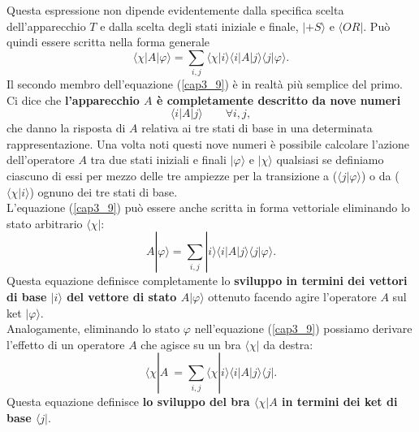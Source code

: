 \documentclass[a4paper,12pt,oneside]{book}
\begin{document}
Questa espressione non dipende evidentemente dalla specifica scelta dell'apparecchio $T$ e dalla scelta degli stati iniziale e finale, $| +S \rangle $ e $\langle OR |$. Può quindi essere scritta nella forma generale
	\begin{equation}
		\boxed{\boxed{
			\langle \chi | A | \varphi \rangle = \sum \limits_{i,j} \langle \chi | i \rangle \langle i | A | j \rangle \langle j | \varphi \rangle .
			}}
	\label{cap3_9}
	\end{equation}
Il secondo membro dell'equazione (\ref{cap3_9}) è in realtà più semplice del primo. Ci dice che \textbf{l'apparecchio $A$ è completamente descritto da nove numeri}
	\begin{equation}
		\boxed{
			\langle i | A | j \rangle  \qquad \forall i,j ,
			}
	\end{equation}
che danno la risposta di $A$ relativa ai tre stati di base in una determinata rappresentazione. Una volta noti questi nove numeri è possibile calcolare l'azione dell'operatore $A$ tra due stati iniziali e finali $| \varphi \rangle $ e $| \chi \rangle$ qualsiasi se definiamo ciascuno di essi per mezzo delle tre ampiezze per la transizione a ($\langle j | \varphi \rangle $) o da ($\langle \chi | i \rangle$) ognuno dei tre stati di base.\\

L'equazione (\ref{cap3_9}) può essere anche scritta in forma vettoriale eliminando lo stato arbitrario $\langle \chi | $:
	\begin{equation}
		\boxed{
			A| \varphi \rangle = \sum \limits_{i,j}  |i \rangle \langle i | A | j \rangle \langle j | \varphi \rangle .
			}
	\label{cap3_10}
	\end{equation}
Questa equazione definisce completamente lo \textbf{sviluppo in termini dei vettori di base $ | i \rangle$ del vettore di stato $A | \varphi \rangle $} ottenuto facendo agire l'operatore $A$ sul ket $ | \varphi \rangle$.\\

Analogamente, eliminando lo stato $\varphi$ nell'equazione (\ref{cap3_9}) possiamo derivare l'effetto di un operatore $A$ che agisce su un bra $ \langle \chi |$ da destra:
	\begin{equation}
		\boxed{
			\langle \chi | A\ = \sum \limits_{i,j} \langle \chi | i \rangle \langle i | A  | j \rangle \langle j | .
			}	
	\label{cap3_11}
	\end{equation}
Questa equazione definisce \textbf{lo sviluppo del bra $\langle \chi |A$ in termini dei ket di base $\langle j |$}.
\end{document}

